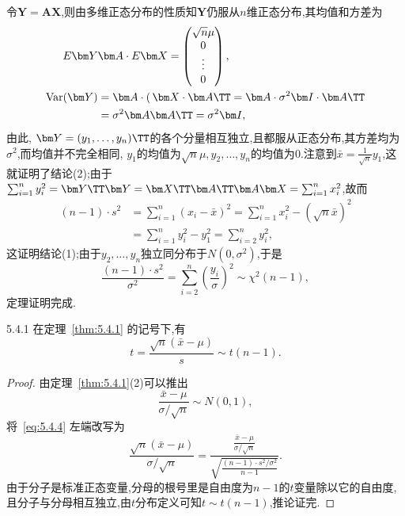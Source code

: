 令$\bm Y=\bm A\bm X$,则由多维正态分布的性质知$\bm Y$仍服从$n$维正态分布,其均值和方差为
\begin{align*}
E\bm Y&\bm A\cdot E\bm X=\begin{pmatrix}
\sqrt n\mu\\0\\\vdots\\0
\end{pmatrix},\\
\operatorname{Var}(\bm Y)&=\bm A\cdot\operatorname(\bm X\cdot\bm A\TT=\bm A\cdot\sigma^2\bm I\cdot \bm A\TT\\
&=\sigma^2\bm A\bm A\TT=\sigma^2\bm I,
\end{align*}
由此, $\bm Y=(y_1,\dotsc,y_n)\TT$的各个分量相互独立,且都服从正态分布,其方差均为$\sigma^2$,而均值并不完全相同, $y_1$的均值为$\sqrt n\mu,y_2,\dotsc,y_n$的均值为$0$.注意到$\bar x=\frac1{\sqrt n}y_1$,这就证明了结论(2);由于$\sum_{i=1}^ny_i^2=\bm Y\TT\bm Y=\bm X\TT\bm A\TT\bm A\bm X=\sum_{i=1}^nx_i^2$,故而
\begin{align*}
(n-1)\cdot s^2&=\sum_{i=1}^n(x_i-\bar x)^2=\sum_{i=1}^nx_i^2-(\sqrt n\bar x)^2\\
&=\sum_{i=1}^ny_i^2-y_1^2=\sum_{i=2}^ny_i^2,
\end{align*}
这证明结论(1);由于$y_2,\dotsc,y_n$独立同分布于$N(0,\sigma^2)$,于是
\begin{equation}\label{eq:5.4.3}
\frac{(n-1)\cdot s^2}{\sigma^2}=\sum_{i=2}^n\left(\frac{y_i}\sigma\right)^2\sim\chi^2(n-1),
\end{equation}
定理证明完成.
\begin{corollary}{}{5.4.1}
在定理~\ref{thm:5.4.1} 的记号下,有
\begin{equation}\label{eq:5.4.4}
t=\frac{\sqrt n(\bar x-\mu)}s\sim t(n-1).
\end{equation}
\end{corollary}
\begin{proof}
由定理~\ref{thm:5.4.1}(2)可以推出
\begin{equation}\label{eq:5.4.5}
\frac{\bar x-\mu}{\sigma/\sqrt n}\sim N(0,1),
\end{equation}
将~\ref{eq:5.4.4} 左端改写为
\begin{equation}\label{eq:5.4.6}
\frac{\sqrt{n}\left( \bar{x}-\mu \right)}{\sigma /\sqrt{n}}=\frac{\frac{\bar{x}-\mu}{\sigma /\sqrt{n}}}{\sqrt{\frac{\left( n-1 \right) \cdot s^2/\sigma ^2}{n-1}}}.
\end{equation}
由于分子是标准正态变量,分母的根号里是自由度为$n-1$的$t$变量除以它的自由度,且分子与分母相互独立,由$t$分布定义可知$t\sim t(n-1)$,推论证完.
\end{proof}
